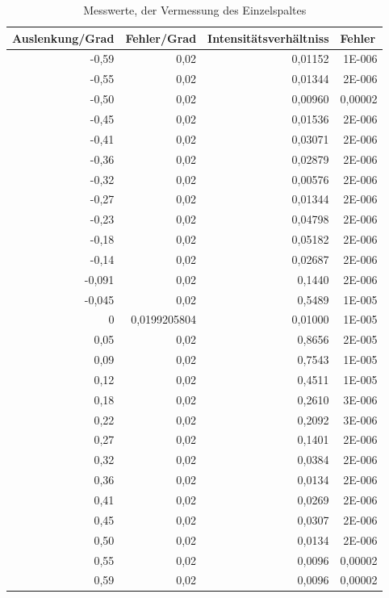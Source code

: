 \documentclass[12pt]{scrartcl}
\begin{document}
\begin{table}[htbp]
\caption{Messwerte, der Vermessung des Einzelspaltes}
\begin{center}
\begin{tabular}{|r|r|r|r|}
\hline
\multicolumn{1}{|l|}{Auslenkung/Grad} & \multicolumn{1}{l|}{Fehler/Grad} & \multicolumn{1}{l|}{Intensitätsverhältniss} & \multicolumn{1}{l|}{Fehler} \\ \hline
-0,59 & 0,02 & 0,01152 & 1E-006 \\ \hline
-0,55 & 0,02 & 0,01344 & 2E-006 \\ \hline
-0,50 & 0,02 & 0,00960 & 0,00002 \\ \hline
-0,45 & 0,02 & 0,01536 & 2E-006 \\ \hline
-0,41 & 0,02 & 0,03071 & 2E-006 \\ \hline
-0,36 & 0,02 & 0,02879 & 2E-006 \\ \hline
-0,32 & 0,02 & 0,00576 & 2E-006 \\ \hline
-0,27 & 0,02 & 0,01344 & 2E-006 \\ \hline
-0,23 & 0,02 & 0,04798 & 2E-006 \\ \hline
-0,18 & 0,02 & 0,05182 & 2E-006 \\ \hline
-0,14 & 0,02 & 0,02687 & 2E-006 \\ \hline
-0,091 & 0,02 & 0,1440 & 2E-006 \\ \hline
-0,045 & 0,02 & 0,5489 & 1E-005 \\ \hline
0 & 0,0199205804 & 0,01000 & 1E-005 \\ \hline
0,05 & 0,02 & 0,8656 & 2E-005 \\ \hline
0,09 & 0,02 & 0,7543 & 1E-005 \\ \hline
0,12 & 0,02 & 0,4511 & 1E-005 \\ \hline
0,18 & 0,02 & 0,2610 & 3E-006 \\ \hline
0,22 & 0,02 & 0,2092 & 3E-006 \\ \hline
0,27 & 0,02 & 0,1401 & 2E-006 \\ \hline
0,32 & 0,02 & 0,0384 & 2E-006 \\ \hline
0,36 & 0,02 & 0,0134 & 2E-006 \\ \hline
0,41 & 0,02 & 0,0269 & 2E-006 \\ \hline
0,45 & 0,02 & 0,0307 & 2E-006 \\ \hline
0,50 & 0,02 & 0,0134 & 2E-006 \\ \hline
0,55 & 0,02 & 0,0096 & 0,00002 \\ \hline
0,59 & 0,02 & 0,0096 & 0,00002 \\ \hline
\end{tabular}
\end{center}
\label{tab:a_1_m}
\end{table}
\end{document}
